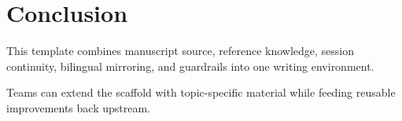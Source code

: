 \section{Conclusion}

This template combines manuscript source, reference knowledge, session continuity, bilingual mirroring, and guardrails into one writing environment.

Teams can extend the scaffold with topic-specific material while feeding reusable improvements back upstream.
